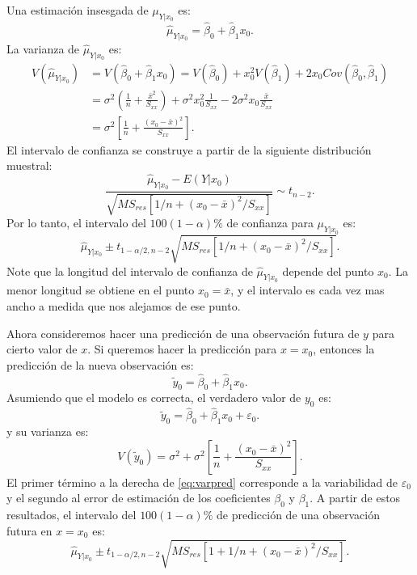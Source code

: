 \documentclass[
]{article}
\begin{document}
Una estimación insesgada de \(\mu_{Y|x_{0}}\) es:
\[
\widehat{\mu}_{Y|x_{0}} = \widehat{\beta}_{0} + \widehat{\beta}_{1}x_{0}.
\]
La varianza de \(\widehat{\mu}_{Y|x_{0}}\) es:
\begin{equation}
\begin{split}
V(\widehat{\mu}_{Y|x_{0}}) &= V(\widehat{\beta}_{0} + \widehat{\beta}_{1}x_{0}) = V(\widehat{\beta}_{0}) + x_{0}^{2}V(\widehat{\beta}_{1}) + 2x_{0}Cov(\widehat{\beta}_{0},\widehat{\beta}_{1}) \\
&= \sigma^{2}\left(\frac{1}{n} + \frac{\bar{x}^{2}}{S_{xx}} \right) + \sigma^{2}x_{0}^{2}\frac{1}{S_{xx}} - 2\sigma^{2}x_{0}\frac{\bar{x}}{S_{xx}} \\
&= \sigma^{2}\left[\frac{1}{n} + \frac{(x_{0}-\bar{x})^{2}}{S_{xx}} \right].
\end{split}
\nonumber
\end{equation}
El intervalo de confianza se construye a partir de la siguiente distribución muestral:
\[
\frac{\widehat{\mu}_{Y|x_{0}} - E(Y|x_{0})}{\sqrt{MS_{res}[1/n+(x_{0}-\bar{x})^{2}/S_{xx}]}} \sim t_{n-2}.
\]
Por lo tanto, el intervalo del \(100(1-\alpha)\%\) de confianza para \(\mu_{Y|x_{0}}\) es:
\begin{equation}
\widehat{\mu}_{Y|x_{0}} \pm t_{1-\alpha/2,n-2}\sqrt{MS_{res}[1/n+(x_{0}-\bar{x})^{2}/S_{xx}]}.
\label{eq:CImean}
\end{equation}
Note que la longitud del intervalo de confianza de \(\widehat{\mu}_{Y|x_{0}}\) depende del punto \(x_{0}\). La menor longitud se obtiene en el punto \(x_{0}=\bar{x}\), y el intervalo es cada vez mas ancho a medida que nos alejamos de ese punto.

Ahora consideremos hacer una predicción de una observación futura de \(y\) para cierto valor de \(x\). Si queremos hacer la predicción para \(x=x_{0}\), entonces la predicción de la nueva observación es:
\[
\widetilde{y}_{0} = \widehat{\beta}_{0} + \widehat{\beta}_{1}x_{0}.
\]
Asumiendo que el modelo es correcta, el verdadero valor de \(y_{0}\) es:
\[
\widetilde{y}_{0} = \widehat{\beta}_{0} + \widehat{\beta}_{1}x_{0} + \varepsilon_{0}.
\]
y su varianza es:
\begin{equation}
V(\widetilde{y}_{0}) = \sigma^{2}+\sigma^{2}\left[\frac{1}{n} + \frac{(x_{0}-\bar{x})^{2}}{S_{xx}} \right].
\label{eq:varpred}
\end{equation}
El primer término a la derecha de \eqref{eq:varpred} corresponde a la variabilidad de \(\varepsilon_{0}\) y el segundo al error de estimación de los coeficientes \(\beta_{0}\) y \(\beta_{1}\). A partir de estos resultados, el intervalo del \(100(1-\alpha)\%\) de predicción de una observación futura en \(x=x_{0}\) es:
\[
\widehat{\mu}_{Y|x_{0}} \pm t_{1-\alpha/2,n-2}\sqrt{MS_{res}[1+1/n+(x_{0}-\bar{x})^{2}/S_{xx}]}.
\]
\end{document}
